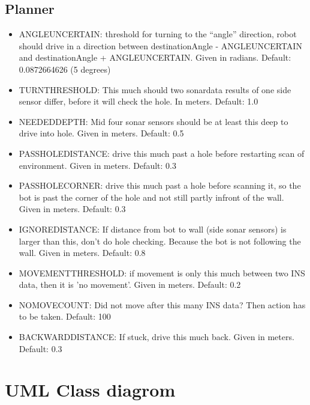 \documentclass[titlepage, a4paper,10pt]{article}
\begin{document}
\subsection{Planner}
\begin{itemize}
\item ANGLEUNCERTAIN: threshold for turning to the ``angle'' direction, robot should drive in a direction between destinationAngle - ANGLEUNCERTAIN and destinationAngle + ANGLEUNCERTAIN. Given in radians. Default: 0.0872664626 (5 degrees)

\item TURNTHRESHOLD: This much should two sonardata results of one side sensor differ, before it will check the hole. In meters. Default: 1.0 

\item NEEDEDDEPTH: Mid four sonar sensors should be at least this deep to drive into hole. Given in meters. Default: 0.5

\item PASSHOLEDISTANCE: drive this much past a hole before restarting scan of environment. Given in meters. Default: 0.3

\item PASSHOLECORNER: drive this much past a hole before scanning it, so the bot is past the corner of the hole and not still partly infront of the wall. Given in meters. Default: 0.3

\item IGNOREDISTANCE: If distance from bot to wall (side sonar sensors) is larger than this, don't do hole checking. Because the bot is not following the wall. Given in meters. Default: 0.8

\item MOVEMENTTHRESHOLD: if movement is only this much between two INS data, then it is 'no movement'. Given in meters. Default: 0.2

\item NOMOVECOUNT: Did not move after this many INS data? Then action has to be taken. Default: 100

\item BACKWARDDISTANCE: If stuck, drive this much back. Given in meters. Default: 0.3

\end{itemize}
\section{UML Class diagrom}

\end{document}
